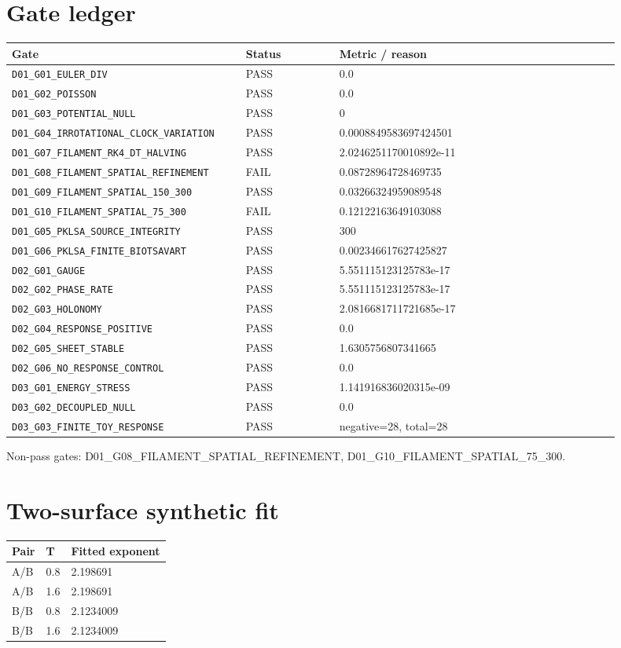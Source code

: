 \documentclass[10pt,a4paper]{article}
\begin{document}
\section{Gate ledger}
\footnotesize
\begin{longtable}{@{}p{0.34\linewidth}p{0.14\linewidth}p{0.42\linewidth}@{}}\toprule
Gate & Status & Metric / reason \\\midrule\endhead
\nolinkurl{D01_G01_EULER_DIV} & PASS & 0.0 \\
\nolinkurl{D01_G02_POISSON} & PASS & 0.0 \\
\nolinkurl{D01_G03_POTENTIAL_NULL} & PASS & 0 \\
\nolinkurl{D01_G04_IRROTATIONAL_CLOCK_VARIATION} & PASS & 0.0008849583697424501 \\
\nolinkurl{D01_G07_FILAMENT_RK4_DT_HALVING} & PASS & 2.0246251170010892e-11 \\
\nolinkurl{D01_G08_FILAMENT_SPATIAL_REFINEMENT} & FAIL & 0.08728964728469735 \\
\nolinkurl{D01_G09_FILAMENT_SPATIAL_150_300} & PASS & 0.03266324959089548 \\
\nolinkurl{D01_G10_FILAMENT_SPATIAL_75_300} & FAIL & 0.12122163649103088 \\
\nolinkurl{D01_G05_PKLSA_SOURCE_INTEGRITY} & PASS & 300 \\
\nolinkurl{D01_G06_PKLSA_FINITE_BIOTSAVART} & PASS & 0.002346617627425827 \\
\nolinkurl{D02_G01_GAUGE} & PASS & 5.551115123125783e-17 \\
\nolinkurl{D02_G02_PHASE_RATE} & PASS & 5.551115123125783e-17 \\
\nolinkurl{D02_G03_HOLONOMY} & PASS & 2.0816681711721685e-17 \\
\nolinkurl{D02_G04_RESPONSE_POSITIVE} & PASS & 0.0 \\
\nolinkurl{D02_G05_SHEET_STABLE} & PASS & 1.6305756807341665 \\
\nolinkurl{D02_G06_NO_RESPONSE_CONTROL} & PASS & 0.0 \\
\nolinkurl{D03_G01_ENERGY_STRESS} & PASS & 1.141916836020315e-09 \\
\nolinkurl{D03_G02_DECOUPLED_NULL} & PASS & 0.0 \\
\nolinkurl{D03_G03_FINITE_TOY_RESPONSE} & PASS & negative=28, total=28 \\
\bottomrule\end{longtable}
\normalsize
Non-pass gates: D01\_G08\_FILAMENT\_SPATIAL\_REFINEMENT, D01\_G10\_FILAMENT\_SPATIAL\_75\_300.
\section{Two-surface synthetic fit}
\begin{tabular}{@{}lll@{}}\toprule Pair & T & Fitted exponent \\\midrule
A/B & 0.8 & 2.198691 \\
A/B & 1.6 & 2.198691 \\
B/B & 0.8 & 2.1234009 \\
B/B & 1.6 & 2.1234009 \\
\bottomrule\end{tabular}
\end{document}
